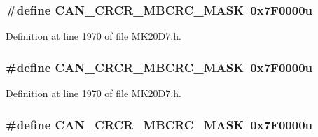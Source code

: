 \subsubsection[{\texorpdfstring{C\+A\+N\+\_\+\+C\+R\+C\+R\+\_\+\+M\+B\+C\+R\+C\+\_\+\+M\+A\+SK}{CAN_CRCR_MBCRC_MASK}}]{\setlength{\rightskip}{0pt plus 5cm}\#define C\+A\+N\+\_\+\+C\+R\+C\+R\+\_\+\+M\+B\+C\+R\+C\+\_\+\+M\+A\+SK~0x7\+F0000u}\hypertarget{group___c_a_n___register___masks_ga8b17ddaa608ead97f25b59e5919d079c}{}\label{group___c_a_n___register___masks_ga8b17ddaa608ead97f25b59e5919d079c}


Definition at line 1970 of file M\+K20\+D7.\+h.

\subsubsection[{\texorpdfstring{C\+A\+N\+\_\+\+C\+R\+C\+R\+\_\+\+M\+B\+C\+R\+C\+\_\+\+M\+A\+SK}{CAN_CRCR_MBCRC_MASK}}]{\setlength{\rightskip}{0pt plus 5cm}\#define C\+A\+N\+\_\+\+C\+R\+C\+R\+\_\+\+M\+B\+C\+R\+C\+\_\+\+M\+A\+SK~0x7\+F0000u}\hypertarget{group___c_a_n___register___masks_ga8b17ddaa608ead97f25b59e5919d079c}{}\label{group___c_a_n___register___masks_ga8b17ddaa608ead97f25b59e5919d079c}


Definition at line 1970 of file M\+K20\+D7.\+h.

\subsubsection[{\texorpdfstring{C\+A\+N\+\_\+\+C\+R\+C\+R\+\_\+\+M\+B\+C\+R\+C\+\_\+\+M\+A\+SK}{CAN_CRCR_MBCRC_MASK}}]{\setlength{\rightskip}{0pt plus 5cm}\#define C\+A\+N\+\_\+\+C\+R\+C\+R\+\_\+\+M\+B\+C\+R\+C\+\_\+\+M\+A\+SK~0x7\+F0000u}\hypertarget{group___c_a_n___register___masks_ga8b17ddaa608ead97f25b59e5919d079c}{}\label{group___c_a_n___register___masks_ga8b17ddaa608ead97f25b59e5919d079c}


